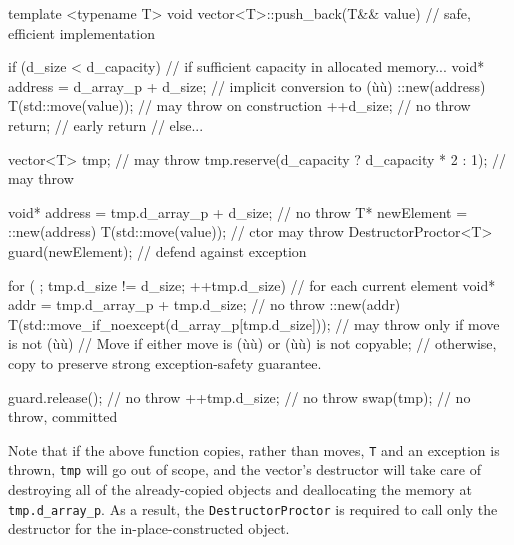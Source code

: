 \begin{emcppslisting}[emcppsbatch=e23]
template <typename T>
void vector<T>::push_back(T&& value)  // safe, efficient implementation
{
    if (d_size < d_capacity)  // if sufficient capacity in allocated memory...
    {
        void* address = d_array_p + d_size;  // implicit conversion to (ù{}ù)
        ::new(address) T(std::move(value));  // may throw on construction
        ++d_size;                            // no throw
        return;                              // early return
    }                                        // else...

    vector<T> tmp;                                 // may throw
    tmp.reserve(d_capacity ? d_capacity * 2 : 1);  // may throw

    void* address = tmp.d_array_p + d_size;              // no throw
    T* newElement = ::new(address) T(std::move(value));  // ctor may throw
    DestructorProctor<T> guard(newElement);        // defend against exception

    for ( ; tmp.d_size != d_size; ++tmp.d_size)    // for each current element
    {
        void* addr = tmp.d_array_p + tmp.d_size;   // no throw
        ::new(addr) T(std::move_if_noexcept(d_array_p[tmp.d_size]));
            // may throw only if move is not (ù{}ù)
            // Move if either move is (ù{}ù) or (ù{}ù) is not copyable;
            // otherwise, copy to preserve strong exception-safety guarantee.
    }

    guard.release();  // no throw
    ++tmp.d_size;     // no throw
    swap(tmp);        // no throw, committed
}
\end{emcppslisting}
    

\noindent Note that if the above function copies, rather than moves, \lstinline!T!
and an exception is thrown, \lstinline!tmp! will go out of scope, and the
vector's destructor will take care of destroying all of the
already-copied objects and deallocating the memory at
\lstinline!tmp.d_array_p!. As a result, the \lstinline!DestructorProctor! is
required to call only the destructor for the in-place-constructed
object.

